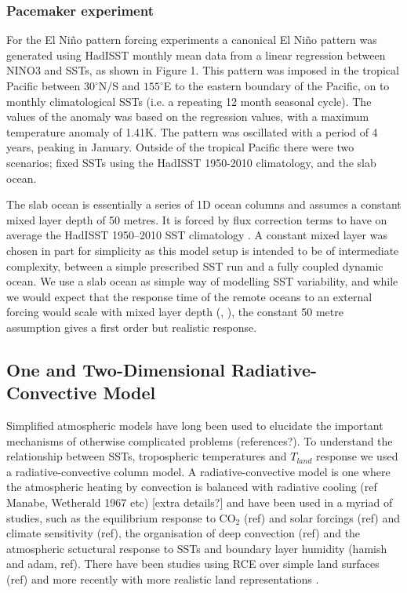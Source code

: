 \subsubsection{Pacemaker experiment}\label{methods:pacemaker}
For the El Ni{\~n}o pattern forcing experiments a canonical El Ni{\~n}o pattern 
was generated using HadISST monthly mean data from a linear regression between 
NINO3 and SSTs, as shown in Figure 1. This pattern was imposed in the tropical 
Pacific between $30^{\circ}$N/S and $155^{\circ}$E to the eastern boundary of 
the Pacific, on to monthly climatological SSTs (i.e. a repeating 12 month 
seasonal cycle).  The values of the anomaly was based on the regression values, 
with a maximum temperature anomaly of 1.41K.  The pattern was oscillated with a 
period of 4 years, peaking in January.  Outside of the tropical Pacific there 
were two scenarios; fixed SSTs using the HadISST 1950-2010 climatology, and the 
slab ocean.  

The slab ocean is essentially a series of 1D ocean columns and assumes a 
constant mixed layer depth of 50 metres. It is forced by flux correction terms 
to have on average the HadISST 1950--2010 SST climatology \citep{Wang2014}. A 
constant mixed layer was chosen in part for simplicity as this model setup is 
intended to be of intermediate complexity, between a simple prescribed SST run 
and a fully coupled dynamic ocean. We use a slab ocean as simple way of 
modelling SST variability, and while we would expect that the response time of 
the remote oceans to an external forcing would scale with mixed layer depth 
(\citealt{Su2005a}, \citealt{Lintner2007}), the constant 50 metre assumption 
gives a first order but realistic response.  


\subsection{One and Two-Dimensional Radiative-Convective Model}
Simplified atmospheric models have long been used to elucidate the important 
mechanisms of otherwise complicated problems (references?). To understand the 
relationship between SSTs, tropospheric temperatures and $T_{land}$ response we 
used a radiative-convective column model. A radiative-convective model is one 
where the atmospheric heating by convection is balanced with radiative cooling 
(ref Manabe, Wetherald 1967 etc) [extra details?] and have been used in a myriad 
of studies, such as the equilibrium response to CO$_2$ (ref) and solar forcings 
(ref) and climate sensitivity (ref), the organisation of deep convection (ref) 
and the atmospheric sctuctural response to SSTs and boundary layer humidity 
(hamish and adam, ref).  There have been studies using RCE over simple land 
surfaces (ref) and more recently with more realistic land representations 
\citep{Rochetin2014}.

